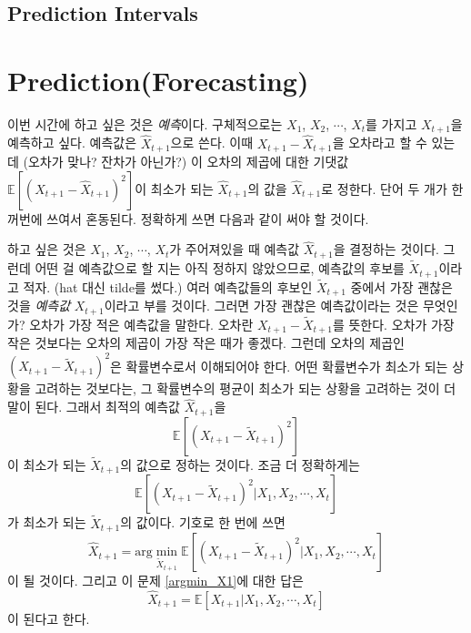 \documentclass{article}
\begin{document}
\subsection{Prediction Intervals}

\section{Prediction(Forecasting)}

이번 시간에 하고 싶은 것은 \emph{예측}이다.
구체적으로는 \(X_1\), \(X_2\), \(\cdots\), \(X_t\)를 가지고 \(X_{t+1}\)을 예측하고 싶다.
예측값은 \(\hat X_{t+1}\)으로 쓴다.
이때 \(X_{t+1}-\hat X_{t+1}\)을 오차라고 할 수 있는데 (오차가 맞나? 잔차가 아닌가?)
이 오차의 제곱에 대한 기댓값 \(\mathbb E[(X_{t+1}-\hat X_{t+1})^2]\)이 최소가 되는 \(\hat X_{t+1}\)의 값을 \(\hat X_{t+1}\)로 정한다.
단어 두 개가 한꺼번에 쓰여서 혼동된다.
정확하게 쓰면 다음과 같이 써야 할 것이다.

하고 싶은 것은 \(X_1\), \(X_2\), \(\cdots\), \(X_t\)가 주어져있을 때 예측값 \(\hat X_{t+1}\)을 결정하는 것이다.
그런데 어떤 걸 예측값으로 할 지는 아직 정하지 않았으므로, 예측값의 후보를 \(\tilde X_{t+1}\)이라고 적자.
(hat 대신 tilde를 썼다.)
여러 예측값들의 후보인 \(\tilde X_{t+1}\) 중에서 가장 괜찮은 것을 \emph{예측값} \(X_{t+1}\)이라고 부를 것이다.
그러면 가장 괜찮은 예측값이라는 것은 무엇인가? 오차가 가장 적은 예측값을 말한다.
오차란 \(X_{t+1}-\tilde X_{t+1}\)를 뜻한다.
오차가 가장 작은 것보다는 오차의 제곱이 가장 작은 때가 좋겠다.
그런데 오차의 제곱인 \(\left(X_{t+1}-\tilde X_{t+1}\right)^2\)은 확률변수로서 이해되어야 한다.
어떤 확률변수가 최소가 되는 상황을 고려하는 것보다는, 그 확률변수의 평균이 최소가 되는 상황을 고려하는 것이 더 말이 된다.
그래서 최적의 예측값 \(\hat X_{t+1}\)을
\[\mathbb E\left[(X_{t+1}-\tilde X_{t+1})^2\right]\]
이 최소가 되는 \(\tilde X_{t+1}\)의 값으로 정하는 것이다.
조금 더 정확하게는
\[\mathbb E\left[(X_{t+1}-\tilde X_{t+1})^2|X_1,X_2,\cdots,X_t\right]\]
가 최소가 되는 \(\tilde X_{t+1}\)의 값이다.
기호로 한 번에 쓰면
\begin{equation}\label{argmin_X1}
\hat X_{t+1}=\text{arg}\min_{\tilde X_{t+1}}\mathbb E\left[(X_{t+1}-\tilde X_{t+1})^2|X_1,X_2,\cdots,X_t\right]
\end{equation}
이 될 것이다.
그리고 이 문제 \eqref{argmin_X1}에 대한 답은
\begin{equation}\label{argmin_X2}
\hat X_{t+1}=\mathbb E[X_{t+1}|X_1,X_2,\cdots,X_t]
\end{equation}
이 된다고 한다.
\end{document}
